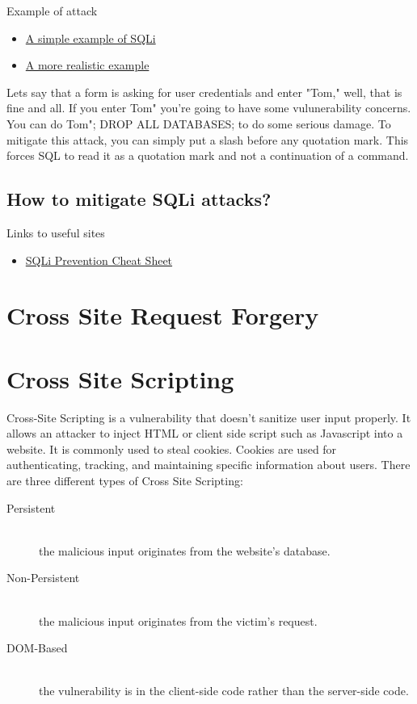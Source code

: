 \documentclass[a4paper, titlepage]{article}
\begin{document}
Example of attack
\begin{itemize}
    \item \href{http://www.w3schools.com/sql/sql_injection.asp}{A simple example of SQLi}
    \item \href{https://www.hackthissite.org/missions/realistic/4/}{A more realistic example}
\end{itemize}

Lets say that a form is asking for user credentials and enter "Tom," well, that is fine and all. If you enter Tom" you're going to have some vulunerability concerns. You can do Tom"; DROP ALL DATABASES; to do some serious damage. To mitigate this attack, you can simply put a slash before any quotation mark. This forces SQL to read it as a quotation mark and not a continuation of a command.

\subsection{How to mitigate SQLi attacks?}
Links to useful sites
\begin{itemize}
    \item \href{https://www.owasp.org/index.php/SQL_Injection_Prevention_Cheat_Sheet}{SQLi Prevention Cheat Sheet}
\end{itemize}
\newpage


\section{Cross Site Request Forgery}
\newpage


\section{Cross Site Scripting}

Cross-Site Scripting is a vulnerability that doesn't sanitize user input properly. It allows an attacker to inject HTML or client side script such as Javascript into a website. It is commonly used to steal cookies. Cookies are used for authenticating, tracking, and maintaining specific information about users. There are three different types of Cross Site Scripting:
\begin{description}
    \item [Persistent] \hfill \\
        the malicious input originates from the website's database.
    \item [Non-Persistent]\hfill \\
        the malicious input originates from the victim's request.
    \item [DOM-Based]\hfill \\
        the vulnerability is in the client-side code rather than the server-side code.
\end{description}
\end{document}
